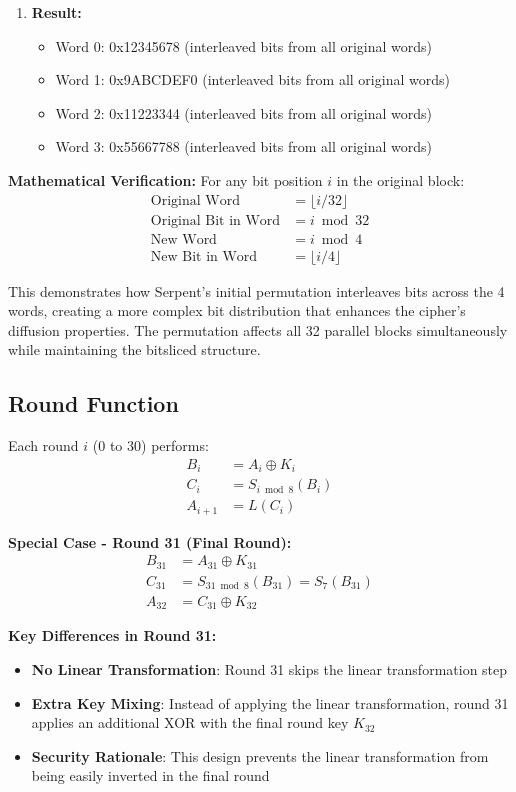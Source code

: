 \documentclass[12pt,a4paper]{article}
\begin{document}
\begin{enumerate}
    \item \textbf{Result:}
    \begin{itemize}
        \item Word 0: 0x12345678 (interleaved bits from all original words)
        \item Word 1: 0x9ABCDEF0 (interleaved bits from all original words)
        \item Word 2: 0x11223344 (interleaved bits from all original words)
        \item Word 3: 0x55667788 (interleaved bits from all original words)
    \end{itemize}
\end{enumerate}

\textbf{Mathematical Verification:}
For any bit position $i$ in the original block:
\begin{align}
\text{Original Word} &= \lfloor i / 32 \rfloor \\
\text{Original Bit in Word} &= i \bmod 32 \\
\text{New Word} &= i \bmod 4 \\
\text{New Bit in Word} &= \lfloor i / 4 \rfloor
\end{align}

This demonstrates how Serpent's initial permutation interleaves bits across the 4 words, creating a more complex bit distribution that enhances the cipher's diffusion properties. The permutation affects all 32 parallel blocks simultaneously while maintaining the bitsliced structure.

\subsection{Round Function}
Each round $i$ (0 to 30) performs:
\begin{align}
B_i &= A_i \oplus K_i \\
C_i &= S_{i \bmod 8}(B_i) \\
A_{i+1} &= L(C_i)
\end{align}

\textbf{Special Case - Round 31 (Final Round):}
\begin{align}
B_{31} &= A_{31} \oplus K_{31} \\
C_{31} &= S_{31 \bmod 8}(B_{31}) = S_7(B_{31}) \\
A_{32} &= C_{31} \oplus K_{32}
\end{align}

\textbf{Key Differences in Round 31:}
\begin{itemize}
    \item \textbf{No Linear Transformation}: Round 31 skips the linear transformation step
    \item \textbf{Extra Key Mixing}: Instead of applying the linear transformation, round 31 applies an additional XOR with the final round key $K_{32}$
    \item \textbf{Security Rationale}: This design prevents the linear transformation from being easily inverted in the final round
\end{itemize}
\end{document}
